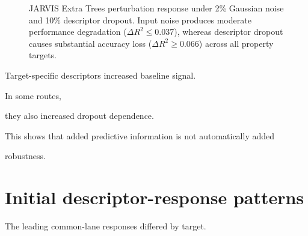 \documentclass[11pt,a4paper,oneside]{report}
\begin{document}
\begin{figure}[H]



\centering






\caption{JARVIS Extra Trees perturbation response under 2\% Gaussian noise and 10\% descriptor dropout. Input noise produces moderate performance degradation ($\Delta R^2 \le 0.037$), whereas descriptor dropout causes substantial accuracy loss ($\Delta R^2 \ge 0.066$) across all property targets.}



\label{fig:jarvis-perturbation}
\end{figure}

Target-specific descriptors increased baseline signal.



In some routes,

they also increased dropout dependence.



This shows that added predictive information is not automatically added

robustness.





\section{Initial descriptor-response patterns}



The leading common-lane responses differed by target.
\end{document}
